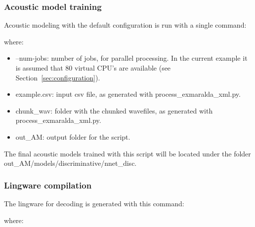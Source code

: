 \documentclass[11pt,a4paper,titlepage,twoside]{article}
\begin{document}
\subsubsection{Acoustic model training}
\label{sec:acoustic-model-training}

Acoustic modeling with the default configuration is run with a single command:

\begin{center}
  \scriptsize
\end{center}

where:

\begin{itemize}
\item --num-jobs: number of jobs, for parallel processing. In the current example it is assumed that 80 virtual CPU's are available (see Section~\ref{sec:configuration}).
\item example.csv: input csv file, as generated with process\_exmaralda\_xml.py.
\item chunk\_wav: folder with the chunked wavefiles, as generated with process\_exmaralda\_xml.py.
\item out\_AM: output folder for the script.
\end{itemize}

The final acoustic models trained with this script will be located under the folder out\_AM/models/discriminative/nnet\_disc.

\subsubsection{Lingware compilation}
\label{sec:lingware-compilation}

The lingware for decoding is generated with this command:

\begin{center}
  \scriptsize
\end{center}

where:
\end{document}
